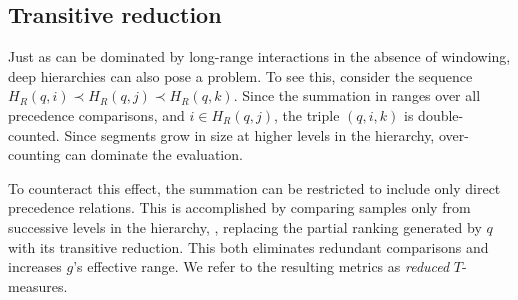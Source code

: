 \documentclass{article}
\begin{document}
\subsection{Transitive reduction}
\label{sec:transitive}

Just as  can be dominated by long-range interactions in the absence of windowing, deep hierarchies can also pose a problem.
To see this, consider the sequence $H_R(q, i) \prec H_R(q, j) \prec H_R(q, k)$.
Since the summation in  ranges over all precedence comparisons, and $i \in H_R(q, j)$, the
triple $(q, i, k)$ is double-counted.
Since segments grow in size at higher levels in the hierarchy, over-counting can dominate the evaluation.

To counteract this effect, the summation can be restricted to include only direct precedence relations.
This is accomplished by comparing samples only from successive levels in the hierarchy, \ie, 
replacing the partial ranking generated by $q$ with its transitive reduction.
This both eliminates redundant comparisons and increases $g$'s effective range.
We refer to the resulting metrics as \emph{reduced} $T$-measures.




\end{document}
